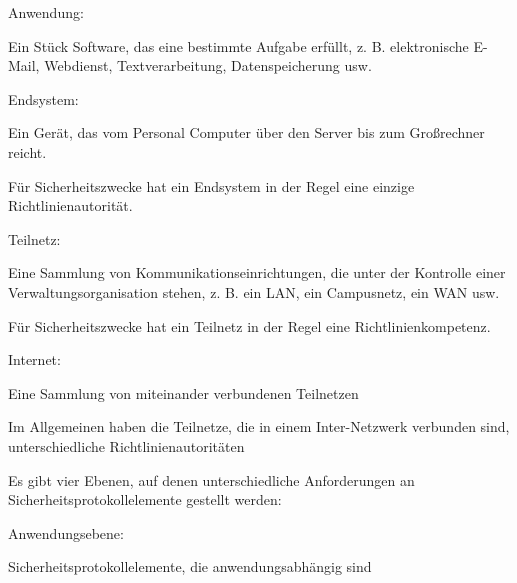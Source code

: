 \documentclass[a4paper]{article}
\begin{document}
\begin{multicols}{3}
      \begin{itemize*}
            \item Anwendung:
            \begin{itemize*}
                  \item Ein Stück Software, das eine bestimmte Aufgabe erfüllt, z. B. elektronische E-Mail, Webdienst, Textverarbeitung, Datenspeicherung usw.
            \end{itemize*}
            \item Endsystem:
            \begin{itemize*}
                  \item Ein Gerät, das vom Personal Computer über den Server bis zum Großrechner reicht.
                  \item Für Sicherheitszwecke hat ein Endsystem in der Regel eine einzige Richtlinienautorität.
            \end{itemize*}
            \item Teilnetz:
            \begin{itemize*}
                  \item Eine Sammlung von Kommunikationseinrichtungen, die unter der Kontrolle einer Verwaltungsorganisation stehen, z. B. ein LAN, ein Campusnetz, ein WAN usw.
                  \item Für Sicherheitszwecke hat ein Teilnetz in der Regel eine Richtlinienkompetenz.
            \end{itemize*}
            \item Internet:
            \begin{itemize*}
                  \item Eine Sammlung von miteinander verbundenen Teilnetzen
                  \item Im Allgemeinen haben die Teilnetze, die in einem Inter-Netzwerk verbunden sind, unterschiedliche Richtlinienautoritäten
            \end{itemize*}
            \item Es gibt vier Ebenen, auf denen unterschiedliche Anforderungen an
            Sicherheitsprotokollelemente gestellt werden:
            \begin{itemize*}
                  \item Anwendungsebene:
                  \begin{itemize*} \item Sicherheitsprotokollelemente, die anwendungsabhängig sind \end{itemize*}

\end{itemize*}
\end{itemize*}
\end{multicols}
\end{document}
